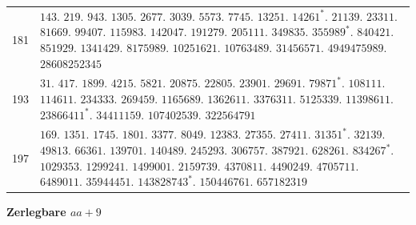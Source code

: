 \begin{longtable}{@{}r|p{\dimexpr\linewidth-38pt\relax}@{}}
181 & $143.$ $219.$ $943.$ $1305.$ $2677.$ $3039.$ $5573.$ $7745.$ $13251.$ $14261^{*}.$ $21139.$ $23311.$ $81669.$ $99407.$ $115983.$ $142047.$ $191279.$ $205111.$ $349835.$ $355989^{*}.$ $840421.$ $851929.$ $1341429.$ $8175989.$ $10251621.$ $10763489.$ $31456571.$ $4949475989.$ $28608252345$\\
193 & $31.$ $417.$ $1899.$ $4215.$ $5821.$ $20875.$ $22805.$ $23901.$ $29691.$ $79871^{*}.$ $108111.$ $114611.$ $234333.$ $269459.$ $1165689.$ $1362611.$ $3376311.$ $5125339.$ $11398611.$ $23866411^{*}.$ $34411159.$ $107402539.$ $322564791$\\
197 & $169.$ $1351.$ $1745.$ $1801.$ $3377.$ $8049.$ $12383.$ $27355.$ $27411.$ $31351^{*}.$ $32139.$ $49813.$ $66361.$ $139701.$ $140489.$ $245293.$ $306757.$ $387921.$ $628261.$ $834267^{*}.$ $1029353.$ $1299241.$ $1499001.$ $2159739.$ $4370811.$ $4490249.$ $4705711.$ $6489011.$ $35944451.$ $143828743^{*}.$ $150446761.$ $657182319$\\
\end{longtable}\endgroup
\par\medskip{}
\centerline{\textbf{Zerlegbare $aa+9$}}\nobreak\smallskip
\begingroup\small\setlength{\tabcolsep}{4pt}
